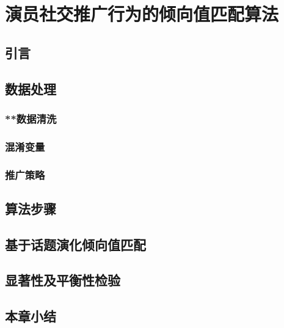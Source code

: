 \chapter{演员社交推广行为的倾向值匹配算法}
\section{引言}
\section{数据处理}
\subsection{**数据清洗}
\subsection{混淆变量}
\subsection{推广策略}
\section{算法步骤}
\section{基于话题演化倾向值匹配}
\section{显著性及平衡性检验}
\section{本章小结}